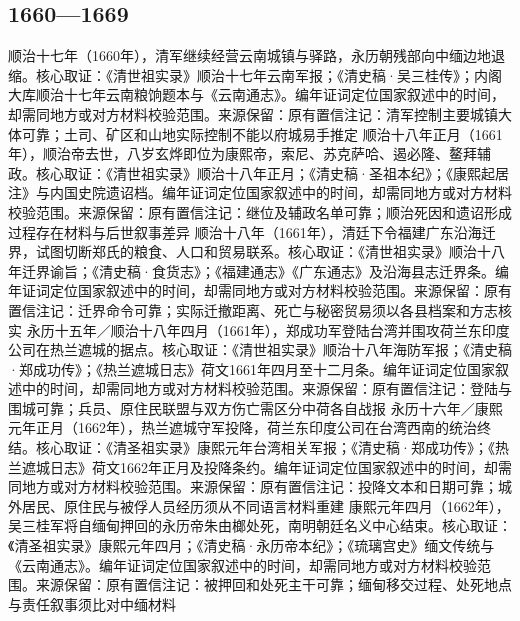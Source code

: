 \subsection{1660—1669}
顺治十七年（1660年），清军继续经营云南城镇与驿路，永历朝残部向中缅边地退缩。核心取证：《清世祖实录》顺治十七年云南军报；《清史稿·吴三桂传》；内阁大库顺治十七年云南粮饷题本与《云南通志》。编年证词定位国家叙述中的时间，却需同地方或对方材料校验范围。来源保留：原有置信注记：清军控制主要城镇大体可靠；土司、矿区和山地实际控制不能以府城易手推定
顺治十八年正月（1661年），顺治帝去世，八岁玄烨即位为康熙帝，索尼、苏克萨哈、遏必隆、鳌拜辅政。核心取证：《清世祖实录》顺治十八年正月；《清史稿·圣祖本纪》；《康熙起居注》与内国史院遗诏档。编年证词定位国家叙述中的时间，却需同地方或对方材料校验范围。来源保留：原有置信注记：继位及辅政名单可靠；顺治死因和遗诏形成过程存在材料与后世叙事差异
顺治十八年（1661年），清廷下令福建广东沿海迁界，试图切断郑氏的粮食、人口和贸易联系。核心取证：《清世祖实录》顺治十八年迁界谕旨；《清史稿·食货志》；《福建通志》《广东通志》及沿海县志迁界条。编年证词定位国家叙述中的时间，却需同地方或对方材料校验范围。来源保留：原有置信注记：迁界命令可靠；实际迁撤距离、死亡与秘密贸易须以各县档案和方志核实
永历十五年／顺治十八年四月（1661年），郑成功军登陆台湾并围攻荷兰东印度公司在热兰遮城的据点。核心取证：《清世祖实录》顺治十八年海防军报；《清史稿·郑成功传》；《热兰遮城日志》荷文1661年四月至十二月条。编年证词定位国家叙述中的时间，却需同地方或对方材料校验范围。来源保留：原有置信注记：登陆与围城可靠；兵员、原住民联盟与双方伤亡需区分中荷各自战报
永历十六年／康熙元年正月（1662年），热兰遮城守军投降，荷兰东印度公司在台湾西南的统治终结。核心取证：《清圣祖实录》康熙元年台湾相关军报；《清史稿·郑成功传》；《热兰遮城日志》荷文1662年正月及投降条约。编年证词定位国家叙述中的时间，却需同地方或对方材料校验范围。来源保留：原有置信注记：投降文本和日期可靠；城外居民、原住民与被俘人员经历须从不同语言材料重建
康熙元年四月（1662年），吴三桂军将自缅甸押回的永历帝朱由榔处死，南明朝廷名义中心结束。核心取证：《清圣祖实录》康熙元年四月；《清史稿·永历帝本纪》；《琉璃宫史》缅文传统与《云南通志》。编年证词定位国家叙述中的时间，却需同地方或对方材料校验范围。来源保留：原有置信注记：被押回和处死主干可靠；缅甸移交过程、处死地点与责任叙事须比对中缅材料
